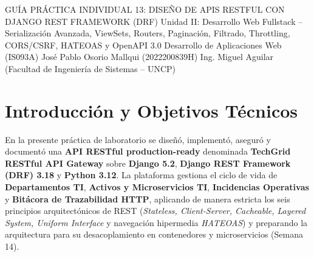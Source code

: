 \documentclass[10pt,a4paper]{article}
\begin{document}
\makeheaderuncp%
    {GUÍA PRÁCTICA INDIVIDUAL 13: DISEÑO DE APIS RESTFUL CON DJANGO REST FRAMEWORK (DRF)}%
    {Unidad II: Desarrollo Web Fullstack -- Serialización Avanzada, ViewSets, Routers, Paginación, Filtrado, Throttling, CORS/CSRF, HATEOAS y OpenAPI 3.0}%
    {Desarrollo de Aplicaciones Web (IS093A)}%
    {José Pablo Osorio Mallqui (2022200839H)}%
    {Ing. Miguel Aguilar (Facultad de Ingeniería de Sistemas -- UNCP)}

\section{Introducción y Objetivos Técnicos}
En la presente práctica de laboratorio se diseñó, implementó, aseguró y documentó una \textbf{API RESTful production-ready} denominada \textbf{TechGrid RESTful API Gateway} sobre \textbf{Django 5.2}, \textbf{Django REST Framework (DRF) 3.18} y \textbf{Python 3.12}. La plataforma gestiona el ciclo de vida de \textbf{Departamentos TI}, \textbf{Activos y Microservicios TI}, \textbf{Incidencias Operativas} y \textbf{Bitácora de Trazabilidad HTTP}, aplicando de manera estricta los seis principios arquitectónicos de REST (\textit{Stateless, Client-Server, Cacheable, Layered System, Uniform Interface} y navegación hipermedia \textit{HATEOAS}) y preparando la arquitectura para su desacoplamiento en contenedores y microservicios (Semana 14).
\end{document}
